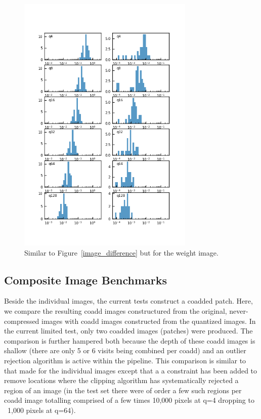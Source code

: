 \begin{figure}
\centering
\includegraphics[width=0.75\textwidth]{figure/compression_metric_v2w.png}
\caption{Similar to Figure~\ref{image_difference} but for the weight image.}
\label{weight_difference}
\end{figure}


\subsection{Composite Image Benchmarks}

Beside the individual images, the current tests construct a coadded patch.  
Here, we compare the resulting coadd images constructured from the original, 
never-compressed images with coadd images constructed from the quantized images.
In the current limited test, only two coadded images (patches) were produced. 
The comparison is further hampered both because the depth of these coadd images 
is shallow (there are only 5 or 6 visits being combined per coadd) and an outlier 
rejection algorithm is active within the pipeline. This comparison is similar to 
that made for the individual images except that a a constraint has been added to 
remove locations where the clipping algorithm has systematically rejected a region 
of an image (in the test set there were of order a few such regions per coadd image
totalling comprised of a few times 10,000 pixels at q=4 dropping to ~1,000 pixels at q=64).

